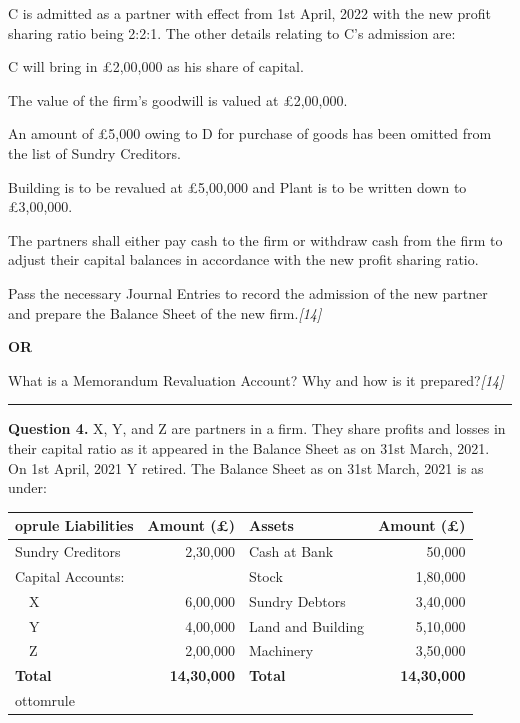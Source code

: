 \documentclass[11pt,a4paper]{article}
\newcommand{\pts}[1]{\hfill   \textit{[#1]}}
\begin{document}
\noindent C is admitted as a partner with effect from 1st April, 2022 with the new profit sharing ratio being 2:2:1. The other details relating to C's admission are:

\begin{parts}
  \item C will bring in \pounds 2,00,000 as his share of capital.
  \item The value of the firm's goodwill is valued at \pounds 2,00,000.
  \item An amount of \pounds 5,000 owing to D for purchase of goods has been omitted from the list of Sundry Creditors.
  \item Building is to be revalued at \pounds 5,00,000 and Plant is to be written down to \pounds 3,00,000.
  \item The partners shall either pay cash to the firm or withdraw cash from the firm to adjust their capital balances in accordance with the new profit sharing ratio.
\end{parts}
Pass the necessary Journal Entries to record the admission of the new partner and prepare the Balance Sheet of the new firm.\pts{14}

\centerline{   \textbf{OR}}

What is a Memorandum Revaluation Account? Why and how is it prepared?\pts{14}

\medskip\rule{\linewidth}{0.2pt}


\newpage




\noindent   \textbf{Question 4.}
X, Y, and Z are partners in a firm. They share profits and losses in their capital ratio as it appeared in the Balance Sheet as on 31st March, 2021. On 1st April, 2021 Y retired. The Balance Sheet as on 31st March, 2021 is as under:


\begin{center}

\begin{tabular}{lr|lr}
 oprule
   \textbf{Liabilities} &   \textbf{Amount (\pounds)} &   \textbf{Assets} &   \textbf{Amount (\pounds)} \\
\midrule
Sundry Creditors & 2,30,000 & Cash at Bank & 50,000 \\
Capital Accounts: & & Stock & 1,80,000 \\
~~X & 6,00,000 & Sundry Debtors & 3,40,000 \\
~~Y & 4,00,000 & Land and Building & 5,10,000 \\
~~Z & 2,00,000 & Machinery & 3,50,000 \\
\midrule
   \textbf{Total} &   \textbf{14,30,000} &   \textbf{Total} &   \textbf{14,30,000} \\
ottomrule
\end{tabular}
\end{center}
\end{document}
